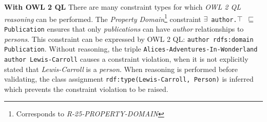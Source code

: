 \documentclass{llncs}
\newcommand{\ms}[1]{\texttt{#1}}
\newenvironment{DL}{
  \vspace{0cm}
  \begin{tabular}{r l}

}{
  \end{tabular}
}
\begin{document}
\textbf{With OWL 2 QL}
There are many constraint types for which {\em OWL 2 QL reasoning} can be performed. 
%
%
%
%
The {\em Property Domain}\footnote{Corresponds to {\em R-25-PROPERTY-DOMAIN}} constraint
\ms{$\exists$ author.$\top$ $\sqsubseteq$ Publication}
ensures that only \emph{publications} can have {\em author} relationships to \emph{persons}.
This constraint can be expressed by OWL 2 QL: \ms{author rdfs:domain Publication}.
Without reasoning, the triple \ms{Alices-Adventures-In-Wonderland author Lewis-Carroll} causes a constraint violation, when it is not explicitly stated that \emph{Lewis-Carroll} is a \emph{person}. 
When reasoning is performed before validating, the class assignment \ms{rdf:type(Lewis-Carroll, Person)} is inferred which prevents the constraint violation to be raised.

%
%
\end{document}
